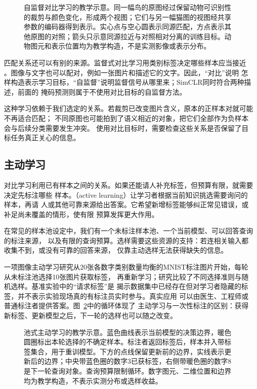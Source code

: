 \begin{figure}[htbp]
  \centering
  
  \caption{自监督对比学习的教学示意。同一幅鸟的原图经过保留动物可识别性的裁剪与颜色变化，形成两个视图；它们与另一幅猫图的视图经共享参数的编码器得到表示。实心点与空心圆表示同源匹配，方点表示其他原图的对照；箭头只示意同源拉近与对照相对分离的训练目标。动物图元和表示位置均为教学构造，不是实测影像或表示分布。}
  \label{fig:contrastive-learning-process}
\end{figure}
\FloatBarrier

匹配关系还可以有别的来源。监督式对比学习用类别标签决定哪些样本应当接近
。图像与文字也可以配对，例如一张图片和描述它的文字。因此，“对比”说明
怎样构造表示学习目标，“自监督”说明监督信号从哪里来；SimCLR同时符合两种描述，前面的
掩码预测则属于不使用对比目标的自监督方法。

这种学习依赖于我们选定的关系。若裁剪已改变图片含义，原本的正样本对就可能不再适合匹配；
不同原图也可能拍到了语义相近的对象，把它们全部作为负样本会与后续分类需要发生冲突。
使用对比目标时，需要检查这些关系是否保留了目标任务真正关心的信息。

\subsection{主动学习}
\label{sec:active-learning}

对比学习利用已有样本之间的关系。如果还能请人补充标签，但预算有限，就需要决定先标注哪些
样本。（active learning）让学习者根据当前知识挑选需要询问的样本，再请
人或其他可靠来源给出答案。它希望新增标签能够纠正常见错误，或补足尚未覆盖的情形，使有限
预算发挥更大作用。

在常见的样本池设定中，我们有一个未标注样本池、一个当前模型、可以回答查询的标注来源，
以及有限的查询预算。选样需要这些资源的支持：若连相关输入都收集不到，或没有可靠的回答来源，
仅靠主动选样无法获得缺失的信息。

一项图像主动学习研究从20张各数字类别数量均衡的MNIST标注图片开始，每轮从未标注池选择10张图片获取标签，
再重新学习；研究比较了不同选择准则与随机选样。基准实验中的“请求标签”是
揭示数据集中已经存在但对学习者隐藏的标签，并不表示实验现场真的有标注员实时参与。真实应用
可以由医生、工程师或普通标注者提供答案。图~\ref{fig:active-learning-loop}中的循环体现了
主动学习与一次性标注的区别：获得新标签、更新模型之后，下一轮的选样也可以随之改变。

\begin{figure}[htbp]
  \centering
  
  \caption{池式主动学习的教学示意。蓝色曲线表示当前模型的决策边界，暖色圆圈标出本轮选择的不确定样本。标注者返回标签后，样本并入带标签集合，用于重训模型。下方的点线保留更新前的边界，实线表示更新后的边界；中央带蓝色圈的数字3已获标签，右侧带暖色圈的数字8是下一轮查询对象。查询预算限制循环。数字图元、二维位置和边界均为教学构造，不表示实测分布或选样收益。}
  \label{fig:active-learning-loop}
\end{figure}
\FloatBarrier

